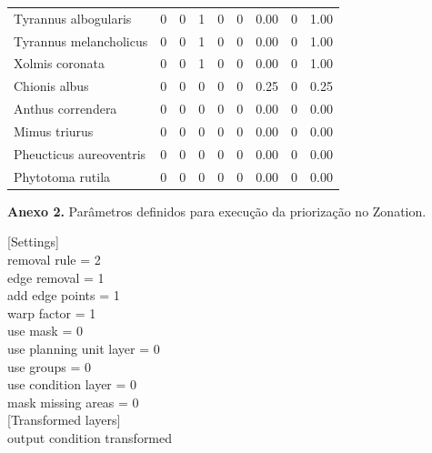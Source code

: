 \documentclass[
]{scrbook}
\begin{document}
\begin{table}
\begin{tabular}{lrrrrrrrr}
Tyrannus albogularis & 0 & 0 & 1 & 0 & 0 & 0.00 & 0 & 1.00\\
Tyrannus melancholicus & 0 & 0 & 1 & 0 & 0 & 0.00 & 0 & 1.00\\
\addlinespace
Xolmis coronata & 0 & 0 & 1 & 0 & 0 & 0.00 & 0 & 1.00\\
Chionis albus & 0 & 0 & 0 & 0 & 0 & 0.25 & 0 & 0.25\\
Anthus correndera & 0 & 0 & 0 & 0 & 0 & 0.00 & 0 & 0.00\\
Mimus triurus & 0 & 0 & 0 & 0 & 0 & 0.00 & 0 & 0.00\\
Pheucticus aureoventris & 0 & 0 & 0 & 0 & 0 & 0.00 & 0 & 0.00\\
\addlinespace
Phytotoma rutila & 0 & 0 & 0 & 0 & 0 & 0.00 & 0 & 0.00\\
\bottomrule
\end{tabular}
\end{table}

\textbf{Anexo 2.} Parâmetros definidos para execução da priorização no Zonation.

{[}Settings{]}\\
removal rule = 2\\
edge removal = 1\\
add edge points = 1\\
warp factor = 1\\
use mask = 0\\
use planning unit layer = 0\\
use groups = 0\\
use condition layer = 0\\
mask missing areas = 0\\
{[}Transformed layers{]}\\
output condition transformed

  
\end{document}
